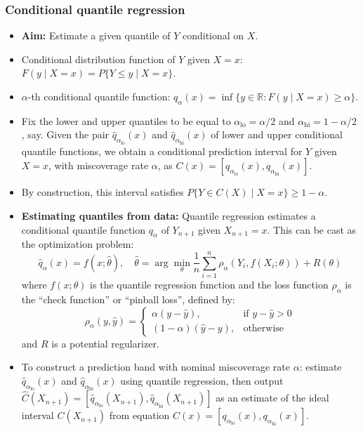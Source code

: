 \documentclass[11pt,a4paper]{article}
\begin{document}
\subsubsection{Conditional quantile regression}
\begin{itemize}
    \item \textbf{Aim:} Estimate a given quantile of $Y$ conditional on $X$.
    \item Conditional distribution function of $Y$ given $X = x$: $F(y \mid X = x) = P\{Y \le y \mid X = x\}$.
    \item $\alpha$-th conditional quantile function: $q_\alpha(x) = \inf\{y \in \mathbb{R} : F(y \mid X = x) \ge \alpha\}$.
    \item Fix the lower and upper quantiles to be equal to $\alpha_{\text{lo}} = \alpha/2$ and $\alpha_{\text{hi}} = 1 - \alpha/2$, say. Given the pair $\hat{q}_{\alpha_{\text{lo}}}(x)$ and $\hat{q}_{\alpha_{\text{hi}}}(x)$ of lower and upper conditional quantile functions, we obtain a conditional prediction interval for $Y$ given $X = x$, with miscoverage rate $\alpha$, as $C(x) = [q_{\alpha_{\text{lo}}}(x), q_{\alpha_{\text{hi}}}(x)]$.
    \item By construction, this interval satisfies $P\{Y \in C(X) \mid X = x\} \ge 1 - \alpha$.
    \item \textbf{Estimating quantiles from data:} Quantile regression estimates a conditional quantile function $q_\alpha$ of $Y_{n+1}$ given $X_{n+1} = x$. This can be cast as the optimization problem:
    \[ \hat{q}_\alpha(x) = f(x; \hat{\theta}), \quad \hat{\theta} = \arg\min_\theta \frac{1}{n}\sum_{i=1}^n \rho_\alpha(Y_i, f(X_i; \theta)) + R(\theta) \]
    where $f(x; \theta)$ is the quantile regression function and the loss function $\rho_\alpha$ is the ``check function'' or ``pinball loss'', defined by:
    \[ \rho_\alpha(y, \hat{y}) = \begin{cases} \alpha(y - \hat{y}), & \text{if } y - \hat{y} > 0 \\ (1 - \alpha)(\hat{y} - y), & \text{otherwise} \end{cases} \]
    and $R$ is a potential regularizer.
    \item To construct a prediction band with nominal miscoverage rate $\alpha$: estimate $\hat{q}_{\alpha_{\text{lo}}}(x)$ and $\hat{q}_{\alpha_{\text{hi}}}(x)$ using quantile regression, then output $\hat{C}(X_{n+1}) = [\hat{q}_{\alpha_{\text{lo}}}(X_{n+1}), \hat{q}_{\alpha_{\text{hi}}}(X_{n+1})]$ as an estimate of the ideal interval $C(X_{n+1})$ from equation $C(x) = [q_{\alpha_{\text{lo}}}(x), q_{\alpha_{\text{hi}}}(x)]$.
\end{itemize}
\end{document}
